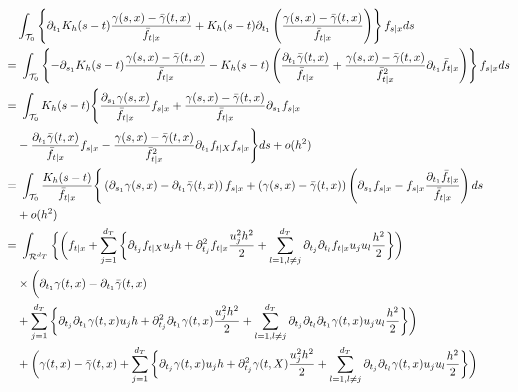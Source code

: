 \documentclass[lettersize, 12pt]{article}
\begin{document}
{\small
\begin{align}
&\int_{\mathcal{T}_0}  \left\{ \partial_{t_1} K_h(s - t) \frac{\gamma(s, x)- \bar \gamma(t, x)}{\bar f_{t|x}} + 
K_h(s - t)  \partial_{t_1}\left( \frac{\gamma(s, x) -\bar  \gamma(t, x)}{\bar f_{t|x}} \right) \right\} f_{s|x} ds
\notag\\
=&\ 
\int_{\mathcal{T}_0}  \left\{ -\partial_{s_1} K_h(s - t) \frac{\gamma(s, x)- \bar \gamma(t, x)}{\bar f_{t|x}} 
-K_h(s - t)  \left( \frac{\partial_{t_1}\bar  \gamma(t, x)}{\bar f_{t|x}} 
+ \frac{\gamma(s,x) - \bar  \gamma(t, x)}{\bar f_{t|x}^2} \partial_{t_1} \bar f_{t|x} \right)
 \right\} f_{s|x} ds
\notag\\
=&\ 
\int_{\mathcal{T}_0}  K_h(s - t)\Bigg\{  
\frac{\partial_{s_1}\gamma(s, x)}{\bar f_{t|x}} f_{s|x} 
+
 \frac{\gamma(s, x) -\bar \gamma(t, x)}{\bar f_{t|x}} \partial_{s_1} f_{s|x}
\notag\\
&-  \frac{\partial_{t_1}\bar \gamma(t, x) }{\bar f_{t|x}}  f_{s|x}
-   \frac{\gamma(s, x) - \bar \gamma(t, x)}{\bar f^2_{t|x}} \partial_{t_1}f_{t|X} f_{s|x}\Bigg\} ds
+ o(h^2)
\notag\\
=&\ 
\int_{\mathcal{T}_0}  \frac{K_h(s - t)}{\bar f_{t|x}}\Bigg\{  
\left(\partial_{s_1} \gamma(s,x) - \partial_{t_1}\bar \gamma(t, x) \right) f_{s|x} 
+
\left(\gamma(s, x) -\bar \gamma(t, x)\right)\left( \partial_{s_1} f_{s|x} - f_{s|x} \frac{\partial_{t_1} \bar f_{t|x}}{\bar f_{t|x}}\right)
ds \notag \\
& + o(h^2)
\notag\\
=&\ 
 \int_{\mathcal{R}^{d_T}}  \bigg\{ 
 \bigg( f_{t|x} + \sum_{j=1}^{d_T} \bigg\{
 \partial_{t_j}f_{t|X} u_j h + \partial_{t_j}^2 f_{t|x} \frac{u_j^2h^2}{2}
  +\sum_{l=1, l\neq j}^{d_T}  \partial_{t_j}\partial_{t_l} f_{t|x} u_j u_l\frac{h^2}{2}\bigg\}
 \bigg)
 \notag\\
 &\times
 \bigg(\partial_{t_1} \gamma(t,x) - \partial_{t_1}\bar \gamma(t, x)
 \notag \\
&  + \sum_{j=1}^{d_T}\bigg\{ \partial_{t_j}\partial_{t_1} \gamma(t,x) u_j h + \partial_{t_j}^2\partial_{t_1} \gamma(t,x) \frac{u_j^2h^2}{2}
+ \sum_{l=1, l\neq j}^{d_T} \partial_{t_j}\partial_{t_l}\partial_{t_1} \gamma(t,x) u_j u_l\frac{h^2}{2} 
 \bigg\} \bigg)
\notag\\
&+ \bigg( \gamma(t, x) -\bar \gamma(t, x) + \sum_{j=1}^{d_T} \bigg\{ \partial_{t_j} \gamma(t, x)u_jh + \partial^2_{t_j} \gamma(t, X)\frac{u_j^2h^2}{2} 
+ \sum_{l=1, l\neq j}^{d_T}\partial_{t_j}\partial_{t_l} \gamma(t,x)u_j u_l \frac{h^2}{2} \bigg\}
\bigg)

\end{align}}
\end{document}
